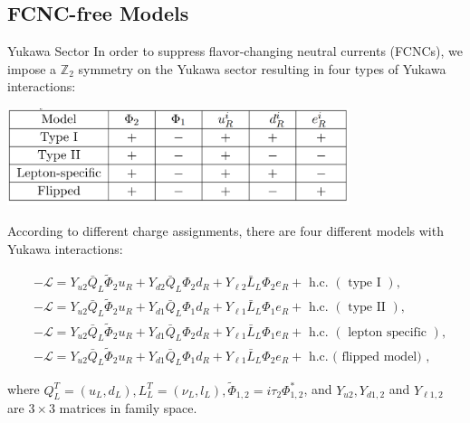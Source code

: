 \documentclass{../bredelebeamer}
\begin{document}
\subsection{FCNC-free Models}
\begin{frame}{Yukawa Sector}
    In order to suppress flavor-changing neutral currents (FCNCs), we impose a $\mathbb{Z}_2$ symmetry on the Yukawa sector resulting in four types of Yukawa interactions:
    \begin{center}
        \includegraphics[width=0.75\textwidth]{Table_Z2_charges.png}
    \end{center}
    According to different charge assignments, there are four different models with Yukawa interactions:

    $$
    \begin{aligned}
    & -\mathcal{L}=Y_{u 2} \bar{Q}_L \tilde{\Phi}_2 u_R+Y_{d 2} \bar{Q}_L \Phi_2 d_R+Y_{\ell 2} \bar{L}_L \Phi_2 e_R+\text { h.c. }(\text { type I }), \\
    & -\mathcal{L}=Y_{u 2} \bar{Q}_L \tilde{\Phi}_2 u_R+Y_{d 1} \bar{Q}_L \Phi_1 d_R+Y_{\ell 1} \bar{L}_L \Phi_1 e_R+\text { h.c. }(\text { type II }), \\
    & -\mathcal{L}=Y_{u 2} \bar{Q}_L \tilde{\Phi}_2 u_R+Y_{d 1} \bar{Q}_L \Phi_2 d_R+Y_{\ell 1} \bar{L}_L \Phi_1 e_R+\text { h.c. }(\text { lepton specific }), \\
    & -\mathcal{L}=Y_{u 2} \bar{Q}_L \tilde{\Phi}_2 u_R+Y_{d 1} \bar{Q}_L \Phi_1 d_R+Y_{\ell 1} \bar{L}_L \Phi_2 e_R+\text { h.c. ( flipped model) },
    \end{aligned}
    $$

    where $Q_L^T=\left(u_L, d_L\right), L_L^T=\left(\nu_L, l_L\right), \widetilde{\Phi}_{1,2}=i \tau_2 \Phi_{1,2}^*$, and $Y_{u 2}, Y_{d 1,2}$ and $Y_{\ell 1,2}$ are $3 \times 3$ matrices in family space.
\end{frame}
\end{document}
